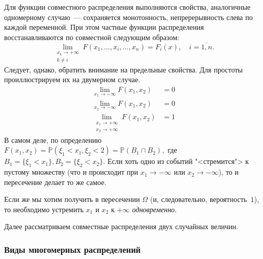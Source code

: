 \begin{rmrk}
    Для функции совместного распределения выполняются свойства, аналогичные одномерному случаю~--- сохраняется монотонность, непререрывность слева по каждой переменной.
    При этом частные функции распределения восстанавливаются по совместной следующим образом:
    \begin{equation*}
        \lim\limits_{\substack{x_{k} \to +\infty \\ k \neq i}}  F(x_{1}, \ldots, x_{i}, \ldots, x_{n}) = F_{i}(x), \quad i = \overline{1,n}.
    \end{equation*}
    Следует, однако, обратить внимание на предельные свойства. 
    Для простоты проиллюстрируем их на двумерном случае.
    \begin{align*}
        \lim\limits_{x_1 \to -\infty} F(x_1, x_2) & = 0 \\
        \lim\limits_{x_2 \to -\infty} F(x_1, x_2) & = 0 \\
        \lim_{
            \substack{
                x_1 \to +\infty \\ 
                x_2 \to +\infty
            }
        } F(x_1, x_2) & = 1
    \end{align*}
    В самом деле, по определению $F(x_1, x_2) = \mathbb{P}(\xi_1 < x_1, \xi_2 < 2) = \mathbb{P}(B_1 \cap B_2),$ 
    где $B_1 = \{\xi_1 < x_1\}, B_2 = \{\xi_2 < x_2\}$. 
    Если хоть одно из событий "<стремится"> к пустому множеству (что и происходит при $x_1 \to -\infty$ или $x_2 \to -\infty$), 
    то и пересечение делает то же самое.

    Если же мы хотим получить в пересечении $\Omega$ (и, следовательно, вероятность~$1$), то необходимо устремить $x_1$ и $x_2$ к $+\infty$ \textit{одновременно}.
\end{rmrk}

Далее рассматриваем совместные распределения двух случайных величин.

\subsubsection{Виды многомерных распределений}

